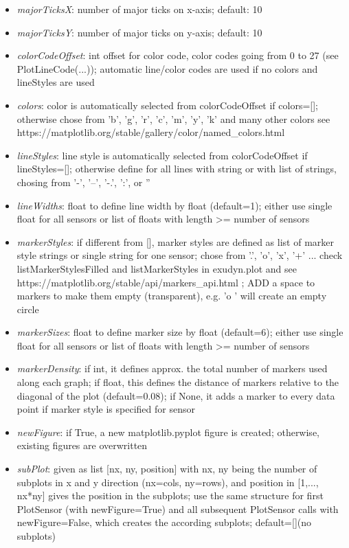 \begin{itemize}[leftmargin=0.7cm]
\begin{itemize}[leftmargin=1.2cm]
\item[]{\it majorTicksX}: number of major ticks on x-axis; default: 10
\item[]{\it majorTicksY}: number of major ticks on y-axis; default: 10
\item[]{\it colorCodeOffset}: int offset for color code, color codes going from 0 to 27 (see PlotLineCode(...)); automatic line/color codes are used if no colors and lineStyles are used
\item[]{\it colors}: color is automatically selected from colorCodeOffset if colors=[]; otherwise chose from 'b', 'g', 'r', 'c', 'm', 'y', 'k' and many other colors see https://matplotlib.org/stable/gallery/color/named\_colors.html
\item[]{\it lineStyles}: line style is automatically selected from colorCodeOffset if lineStyles=[]; otherwise define for all lines with string or with list of strings, chosing from '-', '--', '-.', ':', or ''
\item[]{\it lineWidths}: float to define line width by float (default=1); either use single float for all sensors or list of floats with length >= number of sensors
\item[]{\it markerStyles}: if different from [], marker styles are defined as list of marker style strings or single string for one sensor; chose from '.', 'o', 'x', '+' ... check listMarkerStylesFilled and listMarkerStyles in exudyn.plot and see https://matplotlib.org/stable/api/markers\_api.html ; ADD a space to markers to make them empty (transparent), e.g. 'o ' will create an empty circle
\item[]{\it markerSizes}: float to define marker size by float (default=6); either use single float for all sensors or list of floats with length >= number of sensors
\item[]{\it markerDensity}: if int, it defines approx. the total number of markers used along each graph; if float, this defines the distance of markers relative to the diagonal of the plot (default=0.08); if None, it adds a marker to every data point if marker style is specified for sensor
\item[]{\it newFigure}: if True, a new matplotlib.pyplot figure is created; otherwise, existing figures are overwritten
\item[]{\it subPlot}: given as list [nx, ny, position] with nx, ny being the number of subplots in x and y direction (nx=cols, ny=rows), and position in [1,..., nx*ny] gives the position in the subplots; use the same structure for first PlotSensor (with newFigure=True) and all subsequent PlotSensor calls with newFigure=False, which creates the according subplots; default=[](no subplots)

\end{itemize}
\end{itemize}
